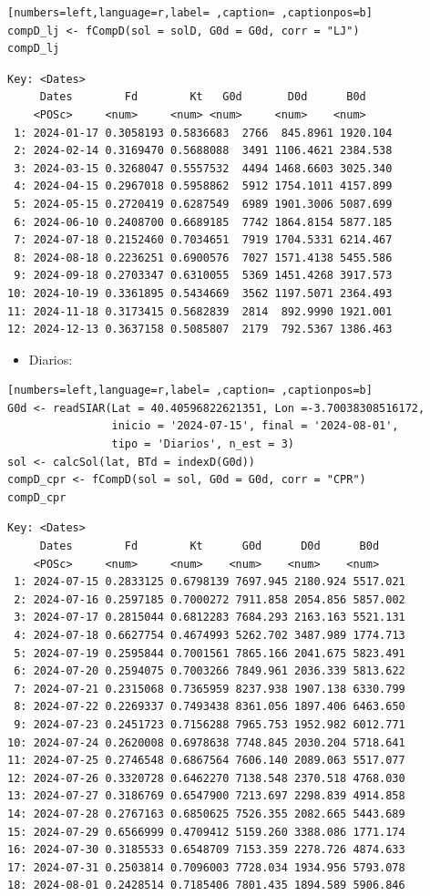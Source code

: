 \begin{itemize}
\begin{lstlisting}[numbers=left,language=r,label= ,caption= ,captionpos=b]
compD_lj <- fCompD(sol = solD, G0d = G0d, corr = "LJ")
compD_lj
\end{lstlisting}

\begin{verbatim}
Key: <Dates>
	 Dates        Fd        Kt   G0d       D0d      B0d
	<POSc>     <num>     <num> <num>     <num>    <num>
 1: 2024-01-17 0.3058193 0.5836683  2766  845.8961 1920.104
 2: 2024-02-14 0.3169470 0.5688088  3491 1106.4621 2384.538
 3: 2024-03-15 0.3268047 0.5557532  4494 1468.6603 3025.340
 4: 2024-04-15 0.2967018 0.5958862  5912 1754.1011 4157.899
 5: 2024-05-15 0.2720419 0.6287549  6989 1901.3006 5087.699
 6: 2024-06-10 0.2408700 0.6689185  7742 1864.8154 5877.185
 7: 2024-07-18 0.2152460 0.7034651  7919 1704.5331 6214.467
 8: 2024-08-18 0.2236251 0.6900576  7027 1571.4138 5455.586
 9: 2024-09-18 0.2703347 0.6310055  5369 1451.4268 3917.573
10: 2024-10-19 0.3361895 0.5434669  3562 1197.5071 2364.493
11: 2024-11-18 0.3173415 0.5682839  2814  892.9990 1921.001
12: 2024-12-13 0.3637158 0.5085807  2179  792.5367 1386.463
\end{verbatim}

\begin{itemize}
\item Diarios:
\end{itemize}
\begin{lstlisting}[numbers=left,language=r,label= ,caption= ,captionpos=b]
G0d <- readSIAR(Lat = 40.40596822621351, Lon =-3.70038308516172,
                inicio = '2024-07-15', final = '2024-08-01',
                tipo = 'Diarios', n_est = 3)
sol <- calcSol(lat, BTd = indexD(G0d))
compD_cpr <- fCompD(sol = sol, G0d = G0d, corr = "CPR")
compD_cpr
\end{lstlisting}

\begin{verbatim}
Key: <Dates>
	 Dates        Fd        Kt      G0d      D0d      B0d
	<POSc>     <num>     <num>    <num>    <num>    <num>
 1: 2024-07-15 0.2833125 0.6798139 7697.945 2180.924 5517.021
 2: 2024-07-16 0.2597185 0.7000272 7911.858 2054.856 5857.002
 3: 2024-07-17 0.2815044 0.6812283 7684.293 2163.163 5521.131
 4: 2024-07-18 0.6627754 0.4674993 5262.702 3487.989 1774.713
 5: 2024-07-19 0.2595844 0.7001561 7865.166 2041.675 5823.491
 6: 2024-07-20 0.2594075 0.7003266 7849.961 2036.339 5813.622
 7: 2024-07-21 0.2315068 0.7365959 8237.938 1907.138 6330.799
 8: 2024-07-22 0.2269337 0.7493438 8361.056 1897.406 6463.650
 9: 2024-07-23 0.2451723 0.7156288 7965.753 1952.982 6012.771
10: 2024-07-24 0.2620008 0.6978638 7748.845 2030.204 5718.641
11: 2024-07-25 0.2746548 0.6867564 7606.140 2089.063 5517.077
12: 2024-07-26 0.3320728 0.6462270 7138.548 2370.518 4768.030
13: 2024-07-27 0.3186769 0.6547900 7213.697 2298.839 4914.858
14: 2024-07-28 0.2767163 0.6850625 7526.355 2082.665 5443.689
15: 2024-07-29 0.6566999 0.4709412 5159.260 3388.086 1771.174
16: 2024-07-30 0.3185533 0.6548709 7153.359 2278.726 4874.633
17: 2024-07-31 0.2503814 0.7096003 7728.034 1934.956 5793.078
18: 2024-08-01 0.2428514 0.7185406 7801.435 1894.589 5906.846
\end{verbatim}


\end{itemize}

